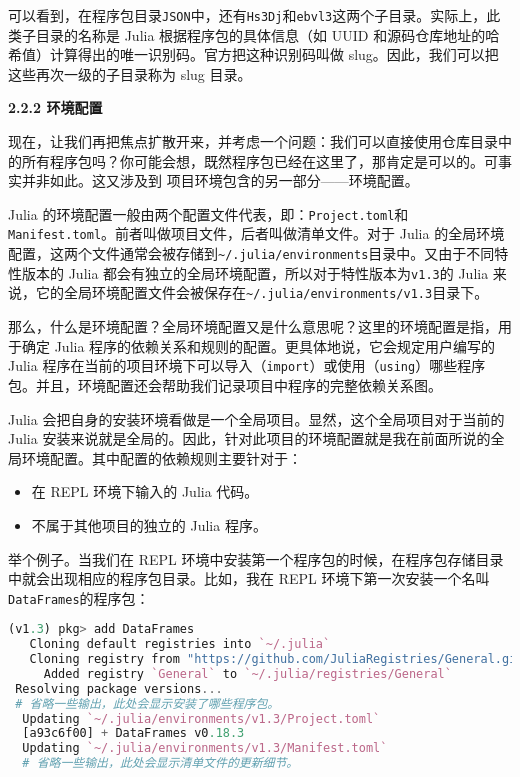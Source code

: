 可以看到，在程序包目录\verb|JSON|中，还有\verb|Hs3Dj|和\verb|ebvl3|这两个子目录。实际上，此类子目录的名称是 Julia 根据程序包的具体信息（如 UUID 和源码仓库地址的哈希值）计算得出的唯一识别码。官方把这种识别码叫做 slug。因此，我们可以把这些再次一级的子目录称为 slug 目录。

\textbf{2.2.2 环境配置}

现在，让我们再把焦点扩散开来，并考虑一个问题：我们可以直接使用仓库目录中的所有程序包吗？你可能会想，既然程序包已经在这里了，那肯定是可以的。可事实并非如此。这又涉及到 项目环境包含的另一部分——环境配置。

Julia 的环境配置一般由两个配置文件代表，即：\verb|Project.toml|和\verb|Manifest.toml|。前者叫做项目文件，后者叫做清单文件。对于 Julia 的全局环境配置，这两个文件通常会被存储到\verb|~/.julia/environments|目录中。又由于不同特性版本的 Julia 都会有独立的全局环境配置，所以对于特性版本为\verb|v1.3|的 Julia 来说，它的全局环境配置文件会被保存在\verb|~/.julia/environments/v1.3|目录下。

那么，什么是环境配置？全局环境配置又是什么意思呢？这里的环境配置是指，用于确定 Julia 程序的依赖关系和规则的配置。更具体地说，它会规定用户编写的 Julia 程序在当前的项目环境下可以导入（\verb|import|）或使用（\verb|using|）哪些程序包。并且，环境配置还会帮助我们记录项目中程序的完整依赖关系图。

Julia 会把自身的安装环境看做是一个全局项目。显然，这个全局项目对于当前的 Julia 安装来说就是全局的。因此，针对此项目的环境配置就是我在前面所说的全局环境配置。其中配置的依赖规则主要针对于：

\begin{itemize}
\item 在 REPL 环境下输入的 Julia 代码。
\item 不属于其他项目的独立的 Julia 程序。
\end{itemize}

举个例子。当我们在 REPL 环境中安装第一个程序包的时候，在程序包存储目录中就会出现相应的程序包目录。比如，我在 REPL 环境下第一次安装一个名叫\verb|DataFrames|的程序包：

\begin{lstlisting}[language=julia]
(v1.3) pkg> add DataFrames
   Cloning default registries into `~/.julia`
   Cloning registry from "https://github.com/JuliaRegistries/General.git"
     Added registry `General` to `~/.julia/registries/General`
 Resolving package versions...
 # 省略一些输出，此处会显示安装了哪些程序包。
  Updating `~/.julia/environments/v1.3/Project.toml`
  [a93c6f00] + DataFrames v0.18.3
  Updating `~/.julia/environments/v1.3/Manifest.toml`
  # 省略一些输出，此处会显示清单文件的更新细节。
\end{lstlisting}


